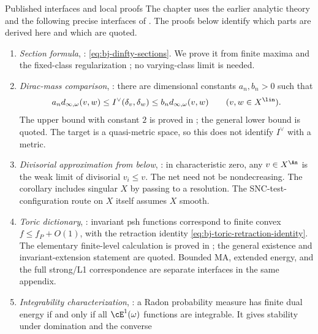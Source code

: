 \begin{important}{Published interfaces and local proofs}
\label{imp:ch49-imported}
The chapter uses the earlier analytic theory and the following precise
interfaces of \cite{BJ22}.  The proofs below identify which parts are
derived here and which are quoted.
\begin{enumerate}
\item\label{itm:ch49-import:sections}
      \emph{Section formula}, \cite[Lemma~11.7]{BJ22}:
      \eqref{eq:bj-dinfty-sections}.  We prove it from finite maxima
      and the fixed-class regularization
      ; no varying-class limit is needed.
\item\label{itm:ch49-import:embedding}
      \emph{Dirac-mass comparison}, \cite[Theorem~11.13]{BJ22}:
      there are dimensional constants $a_n,b_n>0$ such that
      \[
      a_n d_{\infty,\omega}(v,w)
      \le I^\vee(\delta_v,\delta_w)
      \le b_n d_{\infty,\omega}(v,w)
      \qquad(v,w\in X^{\lin}).
      \]
      The upper bound with constant $2$ is proved in
      ; the general lower bound is quoted.
      The target is a quasi-metric space, so this does not identify
      $I^\vee$ with a metric.
\item\label{itm:ch49-import:approximation}
      \emph{Divisorial approximation from below},
      \cite[Corollary~A.3]{BJ22}: in characteristic zero, any
      $v\in X^{\An}$ is the weak limit of divisorial $v_i\le v$.
      The net need not be nondecreasing.  The corollary includes singular
      $X$ by passing to a resolution.  The SNC-test-configuration route
      on $X$ itself assumes $X$ smooth.
\item\label{itm:ch49-import:toriccore}
      \emph{Toric dictionary}, \cite[Appendix~B, pp.~830--831]{BJ22}:
      invariant psh functions correspond to finite convex
      $f\le f_P+O(1)$, with the retraction identity
      \eqref{eq:bj-toric-retraction-identity}.  The elementary
      finite-level calculation is proved in
      ; the general existence and
      invariant-extension statement are quoted.  Bounded MA,
      extended energy, and the full strong/L1 correspondence are
      separate interfaces in the same appendix.
\item\label{itm:ch49-import:extreme}
      \emph{Integrability characterization},
      \cite[Theorem~9.20]{BJ22}: a Radon probability measure has finite
      dual energy if and only if all $\cE^1(\omega)$ functions are
      integrable.  It gives stability under domination and the converse

\end{enumerate}
\end{important}
